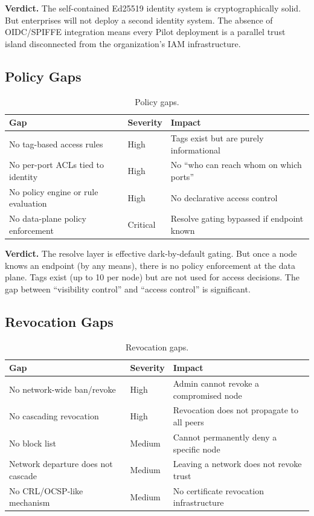 \documentclass[11pt,a4paper]{article}
\begin{document}
\textbf{Verdict.} The self-contained Ed25519 identity system is cryptographically solid. But enterprises will not deploy a second identity system. The absence of OIDC/SPIFFE integration means every Pilot deployment is a parallel trust island disconnected from the organization's IAM infrastructure.

\subsection{Policy Gaps}

\begin{table}[h]
\centering
\begin{tabular}{@{}lll@{}}
\toprule
\textbf{Gap} & \textbf{Severity} & \textbf{Impact} \\
\midrule
No tag-based access rules & High & Tags exist but are purely informational \\
No per-port ACLs tied to identity & High & No ``who can reach whom on which ports'' \\
No policy engine or rule evaluation & High & No declarative access control \\
No data-plane policy enforcement & Critical & Resolve gating bypassed if endpoint known \\
\bottomrule
\end{tabular}
\caption{Policy gaps.}
\end{table}

\textbf{Verdict.} The resolve layer is effective dark-by-default gating. But once a node knows an endpoint (by any means), there is no policy enforcement at the data plane. Tags exist (up to 10 per node) but are not used for access decisions. The gap between ``visibility control'' and ``access control'' is significant.

\subsection{Revocation Gaps}

\begin{table}[h]
\centering
\begin{tabular}{@{}lll@{}}
\toprule
\textbf{Gap} & \textbf{Severity} & \textbf{Impact} \\
\midrule
No network-wide ban/revoke & High & Admin cannot revoke a compromised node \\
No cascading revocation & High & Revocation does not propagate to all peers \\
No block list & Medium & Cannot permanently deny a specific node \\
Network departure does not cascade & Medium & Leaving a network does not revoke trust \\
No CRL/OCSP-like mechanism & Medium & No certificate revocation infrastructure \\
\bottomrule
\end{tabular}
\caption{Revocation gaps.}
\end{table}
\end{document}
